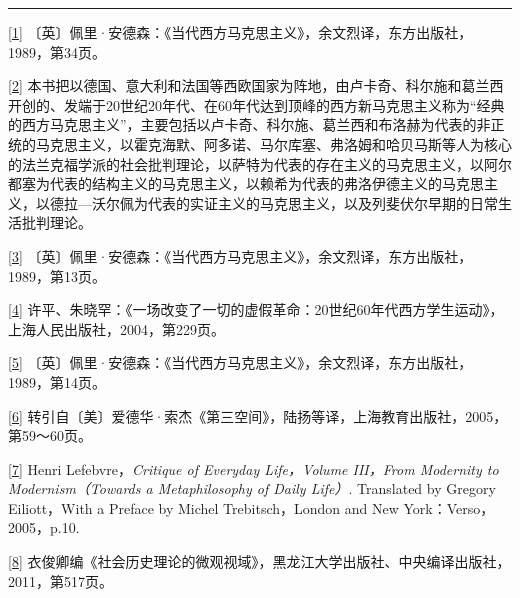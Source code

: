 \documentclass[UTF8, fontset = sourcesans, a4paper, oneside, zihao =
-4, scheme=chinese, no-math, space=true]{ctexbook}
\begin{document}
\begin{center}\rule{0.5\linewidth}{\linethickness}\end{center}

\protect\hypertarget{part0005_split_003.htmlux5cux23m1}{}{}\protect\hyperlink{part0005_split_000.htmlux5cux23w1}{{[}1{]}}
〔英〕佩里·安德森：《当代西方马克思主义》，余文烈译，东方出版社，1989，第34页。

\protect\hypertarget{part0005_split_003.htmlux5cux23m2}{}{}\protect\hyperlink{part0005_split_001.htmlux5cux23w2}{{[}2{]}}
本书把以德国、意大利和法国等西欧国家为阵地，由卢卡奇、科尔施和葛兰西开创的、发端于20世纪20年代、在60年代达到顶峰的西方新马克思主义称为``经典的西方马克思主义''，主要包括以卢卡奇、科尔施、葛兰西和布洛赫为代表的非正统的马克思主义，以霍克海默、阿多诺、马尔库塞、弗洛姆和哈贝马斯等人为核心的法兰克福学派的社会批判理论，以萨特为代表的存在主义的马克思主义，以阿尔都塞为代表的结构主义的马克思主义，以赖希为代表的弗洛伊德主义的马克思主义，以德拉---沃尔佩为代表的实证主义的马克思主义，以及列斐伏尔早期的日常生活批判理论。

\protect\hypertarget{part0005_split_003.htmlux5cux23m3}{}{}\protect\hyperlink{part0005_split_001.htmlux5cux23w3}{{[}3{]}}
〔英〕佩里·安德森：《当代西方马克思主义》，余文烈译，东方出版社，1989，第13页。

\protect\hypertarget{part0005_split_003.htmlux5cux23m4}{}{}\protect\hyperlink{part0005_split_001.htmlux5cux23w4}{{[}4{]}}
许平、朱晓罕：《一场改变了一切的虚假革命：20世纪60年代西方学生运动》，上海人民出版社，2004，第229页。

\protect\hypertarget{part0005_split_003.htmlux5cux23m5}{}{}\protect\hyperlink{part0005_split_001.htmlux5cux23w5}{{[}5{]}}
〔英〕佩里·安德森：《当代西方马克思主义》，余文烈译，东方出版社，1989，第14页。

\protect\hypertarget{part0005_split_003.htmlux5cux23m6}{}{}\protect\hyperlink{part0005_split_001.htmlux5cux23w6}{{[}6{]}}
转引自〔美〕爱德华·索杰《第三空间》，陆扬等译，上海教育出版社，2005，第59～60页。

\protect\hypertarget{part0005_split_003.htmlux5cux23m7}{}{}\protect\hyperlink{part0005_split_001.htmlux5cux23w7}{{[}7{]}}
Henri Lefebvre，\emph{Critique of Everyday Life，Volume III，From
Modernity to Modernism（Towards a Metaphilosophy of Daily Life）}.
Translated by Gregory Eiliott，With a Preface by Michel
Trebitsch，London and New York：Verso，2005，p.10.

\protect\hypertarget{part0005_split_003.htmlux5cux23m8}{}{}\protect\hyperlink{part0005_split_001.htmlux5cux23w8}{{[}8{]}}
衣俊卿编《社会历史理论的微观视域》，黑龙江大学出版社、中央编译出版社，2011，第517页。
\end{document}
